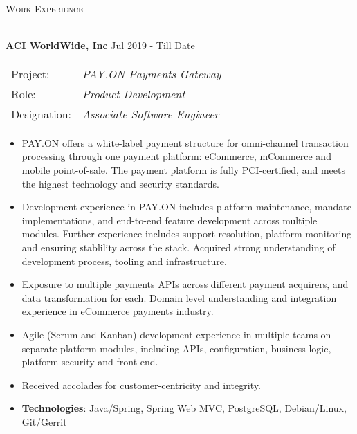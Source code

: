 \documentclass[a4paper]{article}
\newcommand{\lineunder} {
    \vspace*{-8pt} \\
    \hspace*{-18pt} \hrulefill \\
}
\newcommand{\header} [1] {
    {\hspace*{-18pt}\vspace*{6pt} \textsc{#1}}
    \vspace*{-6pt} \lineunder
}
\begin{document}
\header{Work Experience}
\vspace{1mm}

\textbf{ACI WorldWide, Inc} \hfill Jul 2019 - Till Date\\
\begin{tabular}{ l l }
Project: & \textit{PAY.ON Payments Gateway} \\
Role: & \textit{Product Development} \\
Designation: & \textit{Associate Software Engineer}
\end{tabular}
\vspace{-1mm}
\begin{itemize} \itemsep 1pt
	\item PAY.ON offers a white-label payment structure for omni-channel transaction processing through one payment platform: eCommerce, mCommerce and mobile point-of-sale. The payment platform is fully PCI-certified, and meets the highest technology and security standards.
	\item Development experience in PAY.ON includes platform maintenance, mandate implementations, and end-to-end feature development across multiple modules. Further experience includes support resolution, platform monitoring and ensuring stablility across the stack. Acquired strong understanding of development process, tooling and infrastructure.
  \item Exposure to multiple payments APIs across different payment acquirers, and data transformation for each. Domain level understanding and integration experience in eCommerce payments industry.
  \item Agile (Scrum and Kanban) development experience in multiple teams on separate platform modules, including APIs, configuration, business logic, platform security and front-end.
  \item Received accolades for customer-centricity and integrity.
	\item \textbf{Technologies}: Java/Spring, Spring Web MVC, PostgreSQL, Debian/Linux, Git/Gerrit
\end{itemize}
\end{document}
